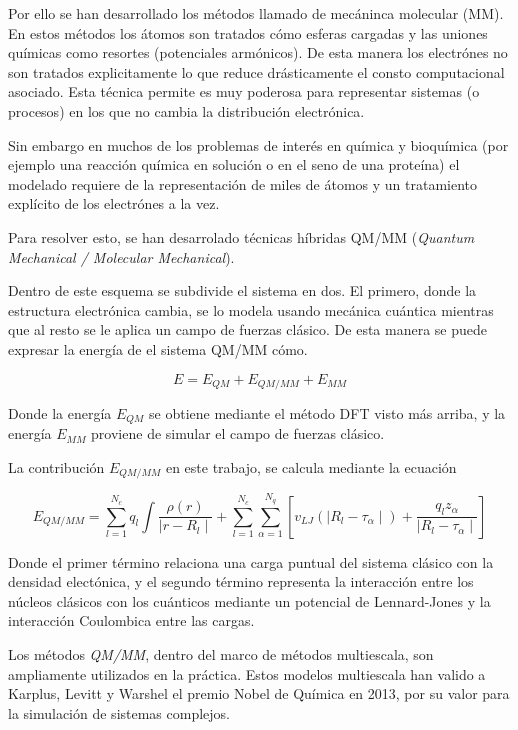 Por ello se han desarrollado los m\'etodos llamado de mec\'aninca molecular (MM). En estos m\'etodos los \'atomos son tratados c\'omo esferas cargadas y las uniones qu\'imicas como resortes (potenciales arm\'onicos).
De esta manera los electr\'ones no son tratados explicitamente lo que reduce dr\'asticamente el consto computacional asociado. Esta t\'ecnica permite es muy poderosa para representar sistemas (o procesos) en los que no cambia la distribuci\'on
electr\'onica.

Sin embargo en muchos de los problemas de inter\'es en qu\'imica y bioqu\'imica (por ejemplo una reacci\'on qu\'imica en soluci\'on o en el seno de una prote\'ina)
 el modelado requiere de la representaci\'on de miles de \'atomos y un tratamiento expl\'icito de los electr\'ones a la vez.

Para resolver esto, se han desarrolado t\'ecnicas h\'ibridas QM/MM (\textit{Quantum Mechanical / Molecular Mechanical}).

Dentro de este esquema se subdivide el sistema en dos. El primero, donde la estructura electr\'onica cambia, se lo modela usando mec\'anica cu\'antica mientras que al resto se le aplica un campo de 
fuerzas cl\'asico. De esta manera se puede expresar la energ\'ia de el sistema QM/MM c\'omo.

\begin{equation}
    E = E_{QM} + E_{QM/MM} + E_{MM}
\end{equation}

Donde la energ\'ia $E_{QM}$ se obtiene mediante el m\'etodo DFT visto m\'as arriba, y la energ\'ia
$E_{MM}$ proviene de simular el campo de fuerzas cl\'asico.

La contribuci\'on $E_{QM/MM}$ en este trabajo, se calcula mediante la ecuaci\'on

\begin{equation}
    E_{QM/MM} = \sum_{l = 1}^{N_c} q_l \int \frac{\rho(r)}{\mid r - R_l \mid} + \sum_{l = 1}^{N_c}\sum_{\alpha = 1}^{N_q} [ v_{LJ} ( \mid R_l - \tau_\alpha \mid ) + \frac{q_l z_\alpha}{\mid R_l - \tau_\alpha \mid} ]
\end{equation}

Donde el primer t\'ermino relaciona una carga puntual del sistema cl\'asico con la densidad
elect\'onica, y el segundo t\'ermino representa la interacci\'on entre los n\'ucleos cl\'asicos
con los cu\'anticos mediante un potencial de Lennard-Jones y la interacci\'on Coulombica entre
las cargas.

Los m\'etodos \textit{QM/MM}, dentro del marco de m\'etodos multiescala, son ampliamente utilizados en
la pr\'actica. Estos modelos multiescala han valido a Karplus, Levitt y
Warshel el premio Nobel de Qu\'imica en 2013, por su valor para la simulaci\'on de sistemas complejos.

